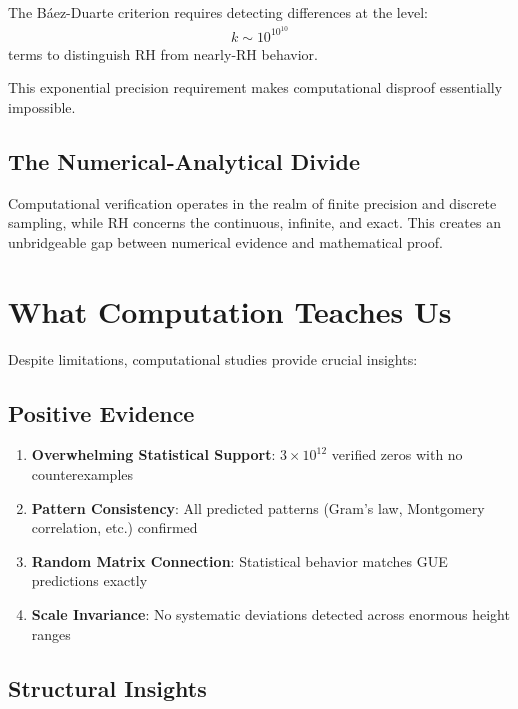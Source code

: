 \begin{example}
The Báez-Duarte criterion requires detecting differences at the level:
\begin{align}
k \sim 10^{10^{10}}
\end{align}
terms to distinguish RH from nearly-RH behavior.
\end{example}

This exponential precision requirement makes computational disproof essentially impossible.

\subsection{The Numerical-Analytical Divide}

\begin{remark}
Computational verification operates in the realm of finite precision and discrete sampling, while RH concerns the continuous, infinite, and exact. This creates an unbridgeable gap between numerical evidence and mathematical proof.
\end{remark}

\section{What Computation Teaches Us}
\label{sec:lessons}

Despite limitations, computational studies provide crucial insights:

\subsection{Positive Evidence}

\begin{enumerate}
\item \textbf{Overwhelming Statistical Support}: $3 \times 10^{12}$ verified zeros with no counterexamples
\item \textbf{Pattern Consistency}: All predicted patterns (Gram's law, Montgomery correlation, etc.) confirmed
\item \textbf{Random Matrix Connection}: Statistical behavior matches GUE predictions exactly
\item \textbf{Scale Invariance}: No systematic deviations detected across enormous height ranges
\end{enumerate}

\subsection{Structural Insights}

